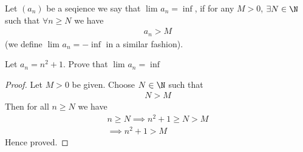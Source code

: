 \begin{definition}
	Let $\left( a_n \right) $ be a seqience we say that $\lim_{} a_n = \inf$, if for any $M > 0$, $\exists N \in  \N$ such that $\forall n \ge N$ we have
	\begin{align}
		a_n > M
	\end{align}
	(we define $\lim_{} a_n = -\inf$ in a similar fashion).
\end{definition}

\begin{eg}
	Let $a_n = n^{2} + 1$. Prove that $\lim_{} a_n = \inf$
\end{eg}

\begin{proof}
	Let $M > 0$ be given. Choose $N \in  \N$ such that
	\begin{align}
		N > M
	\end{align}
	Then for all $n \ge  N$ we have
	\begin{align}
		n \ge N \implies n^{2} + 1 \ge N > M \\
		\implies n^{2} + 1 > M
	\end{align}
	Hence proved.
\end{proof}










